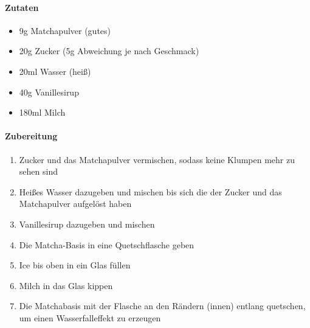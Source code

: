 \newpage
{}
\paragraph{Zutaten}
\begin{itemize}[noitemsep]
	\item 9g Matchapulver (gutes)
	\item 20g Zucker (5g Abweichung je nach Geschmack)
	\item 20ml Wasser (heiß)
	\item 40g Vanillesirup
	\item 180ml Milch
\end{itemize}


\paragraph{Zubereitung}
\begin{enumerate}[noitemsep]
	\item Zucker und das Matchapulver vermischen, sodass keine Klumpen mehr zu sehen sind
	\item Heißes Wasser dazugeben und mischen bis sich die der Zucker und das Matchapulver aufgelöst haben
	\item Vanillesirup dazugeben und mischen
	\item Die Matcha-Basis in eine Quetschflasche geben
	\item Ice bis oben in ein Glas füllen
	\item Milch in das Glas kippen
	\item Die Matchabasis mit der Flasche an den Rändern (innen) entlang quetschen, um einen Wasserfalleffekt zu erzeugen
\end{enumerate}

